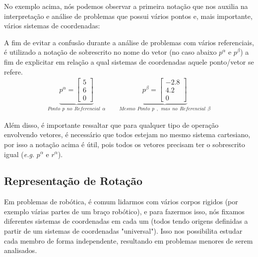 \documentclass{article}
\begin{document}
            No exemplo acima, nós podemos observar a primeira notação que nos auxilia na interpretação e análise de problemas que possui vários pontos e, mais importante, vários sistemas de coordenadas:
            \begin{note}
                A fim de evitar a confusão durante a análise de problemas com vários referenciais, é utilizado a notação de sobrescrito no nome do vetor (no caso abaixo $p^\alpha$ e $p^\beta$) a fim de explicitar em relação a qual sistemas de coordenadas aquele ponto/vetor se refere.
                \begin{align*}
                    \underbrace{p^\alpha = \begin{bmatrix}
                        5 \\ 
                        6 \\
                        0
                    \end{bmatrix}}_{Ponto \ \ p \ \ no \ \ Referencial \ \  \alpha} \ \ \ \ \ \ \ \ \ 
                    \underbrace{p^\beta = \begin{bmatrix}
                        -2.8 \\ 
                        4.2 \\
                        0
                    \end{bmatrix}}_{Mesmo \ \ Ponto \ \ p \ \ , \ \ mas \ \ no \ \ Referencial \ \  \beta}
            \end{align*}            
        
                Além disso, é importante ressaltar que para qualquer tipo de operação envolvendo vetores, é necessário que todos estejam no mesmo sistema cartesiano, por isso a notação acima é útil, pois todos os vetores precisam ter o sobrescrito igual (\emph{e.g.} $p^\alpha$ e $r^\alpha$).
            \end{note}

        \subsection{Representação de Rotação}
            Em problemas de robótica, é comum lidarmos com vários corpos rigidos (por exemplo várias partes de um braço robótico), e para fazermos isso, nós fixamos diferentes sistemas de coordenadas em cada um (todos tendo origens definidas a partir de um sistemas de coordenadas "universal"). Isso nos possibilita estudar cada membro de forma independente, resultando em problemas menores de serem analisados.
\end{document}
